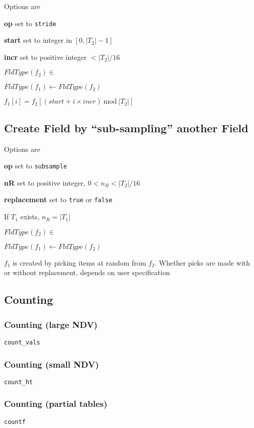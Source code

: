 \bi
\item 
Options are 
\be
\item {\bf op} set to {\tt stride} 
\item {\bf start} set to integer in \([0, |T_2|-1]\)
\item {\bf incr} set to positive integer \(< |T_2|/16\)
\ee
\item \(FldType(f_2) \in \) \NumericTypes
\item \(FldType(f_1) \leftarrow FldType(f_2)\)
\item \(f_1[i] = f_2[(start + i \times incr) \mathrm{~mod~} |T_2|]\) 
\ei
\subsection{Create Field by ``sub-sampling'' another Field}
\label{subsample} 

\bi
\item 
Options are 
\be
\item {\bf op} set to {\tt subsample} 
\item {\bf nR} set to positive integer, \(0 < n_R < |T_2|/16\)
\item {\bf replacement} set to {\tt true} or {\tt false}
\ee
\item  If \(T_1\) exists, \(n_R = |T_1|\)
\item \(FldType(f_2) \in \) \NumericTypes
\item \(FldType(f_1) \leftarrow FldType(f_2)\)
\item \(f_1\) is created by picking items at random from \(f_2\).
Whether picks are made with or without replacement, depends on user
specification
\ei

\subsection{Counting}
\label{Counting}

\subsubsection{Counting (large NDV)}
\verb+count_vals+
\subsubsection{Counting (small NDV)}
\verb+count_ht+
\subsubsection{Counting (partial tables)}
\verb+countf+

